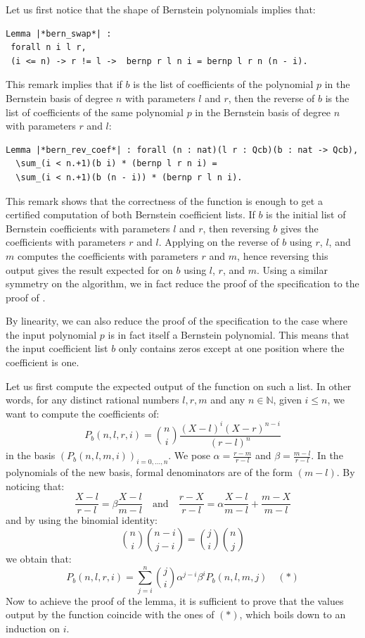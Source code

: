\documentclass{mscs}
\begin{document}
Let us first notice that the shape of Bernstein polynomials implies
that:
\begin{lstlisting}
Lemma |*bern_swap*| :
 forall n i l r,
 (i <= n) -> r != l ->  bernp r l n i = bernp l r n (n - i).
\end{lstlisting}
This remark implies that if $b$ is the list of coefficients of the
polynomial $p$ in the Bernstein basis of degree $n$ with parameters
$l$ and $r$, then the reverse of $b$ is the list of coefficients of
the same polynomial $p$ in the Bernstein basis of degree $n$ with
parameters $r$ and $l$:

\begin{lstlisting}
Lemma |*bern_rev_coef*| : forall (n : nat)(l r : Qcb)(b : nat -> Qcb),
  \sum_(i < n.+1)(b i) * (bernp l r n i) =
  \sum_(i < n.+1)(b (n - i)) * (bernp r l n i).
\end{lstlisting}
This remark shows that the correctness of the  function is
enough to get a certified computation of both Bernstein coefficient
lists.  If $b$ is the
initial list of Bernstein coefficients with parameters $l$ and $r$, then
reversing $b$ gives the  coefficients with parameters $r$ and $l$.
Applying  on the reverse of $b$ using $r$, $l$, and $m$
computes the coefficients with parameters $r$ and $m$, hence reversing
this output gives the result expected for  on $b$ using $l$,
$r$, and $m$. Using a similar symmetry on the
 algorithm, we in fact reduce the proof of the
 specification to the proof of .

By linearity, we can also reduce the proof of the 
specification to the case where the input polynomial $p$ is in fact
itself a Bernstein polynomial. This means that the input coefficient
list $b$ only contains zeros except at one position where the
coefficient is one.

Let us first compute the expected output of the  function on
such a list. In other words, for any distinct rational numbers $l,
r, m$ and any $n\in \mathbb{N}$, given $i \leq n$, we want to compute
the coefficients of:
$$P_b(n, l, r, i) = \binom{n}{i} \frac{(X - l)^i(X - r)^{n -i}}
{(r - l)^n}$$ in the basis $(P_b(n, l, m, i))_{i = 0, \dots, n}$.
We pose
$\alpha = \frac{r -  m}{r - l}$ and $\beta = \frac{m - l}{r - l}$.
In the polynomials of the new basis, formal denominators are of the
form $(m - l)$. By noticing that:
$$\frac{X - l}{r-l} = \beta \frac{X - l}{m - l} \quad \textrm{and} \quad
\frac{r - X}{r - l} = \alpha\frac{X - l}{m - l} +\frac{m - X}{m - l}$$
and by using the binomial identity:
$$\binom{n}{i}\binom{n - i}{j - i}  = \binom{j}{i}\binom{n}{j}$$
we obtain that:
$$P_b(n, l, r, i) =
\sum_{j = i}^n\binom{j}{i}\alpha^{j-i}\beta^i P_b(n, l, m, j)  \quad (*)$$
Now to achieve the proof of the  lemma, it is
sufficient to prove that the values output by the  function
coincide with the ones of $(*)$, which boils down to an induction on $i$.
\end{document}
